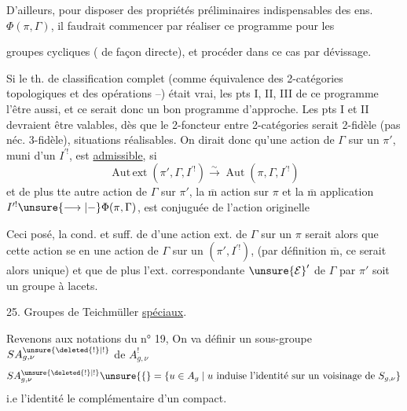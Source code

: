 D'ailleurs, pour disposer des propriétés préliminaires indispensables des ens. $\Phi(\pi,\Gamma)$, il faudrait commencer par réaliser ce programme pour les


groupes cycliques ( de façon directe), et procéder dans ce cas par dévissage.

Si le th. de classification complet (comme équivalence des 2-catégories  topologiques et des opérations  --) était vrai, les pts I, II, III de ce programme  l'être aussi, et ce serait donc un bon programme d'approche. Les pts I et II devraient être valables, dès que le 2-foncteur entre 2-catégories serait 2-fidèle (pas néc.  3-fidèle),   situations réalisables. On dirait donc qu'une action  de $\Gamma$ sur un $\pi'$, muni d'un $I^{\prime !}$, est \uline{admissible}, si 
\[
\operatorname{Aut\,ext}(\pi',\Gamma,I^{\prime !})\xrightarrow{\sim}\operatorname{Aut}(\pi,\Gamma,I^{\prime !})
\]
et  de plus tte  autre action de $\Gamma$ sur $\pi'$,  la $\overline{\mathrm m}$ action sur $\pi$ et la $\overline{\mathrm m}$ application $I^{\prime !}\unsure{\longrightarrow|{-}}\Phi(\pi,\Gamma)$, est conjuguée de l'action originelle


Ceci posé, la cond.  et suff. de  d'une action ext.  de $\Gamma$ sur un $\pi$ serait alors que cette action se   en une action  de $\Gamma$ sur un $(\pi',I^{\prime !})$,  (par définition $\overline{\mathrm m}$, ce  serait  alors  unique) et que de plus l'ext. correspondante $\unsure{\mathcal E}'$ de $\Gamma$ par $\pi'$ soit un groupe à lacets.

25. Groupes de Teichmüller \uline{spéciaux}.

Revenons aux notations du n° 19, On va définir un sous-groupe $SA_{g,\nu}^{\unsure{\deleted{!}|!}}$ de $A_{g,\nu}^{!}$
\[
SA_{g,\nu}^{\unsure{\deleted{!}|!}}\unsure{\{} =
\{u\in A_g\mid u\text{ induise l'identité sur un voisinage de }S_{g,\nu}\}
\]
i.e   l'identité  le complémentaire d'un compact.


